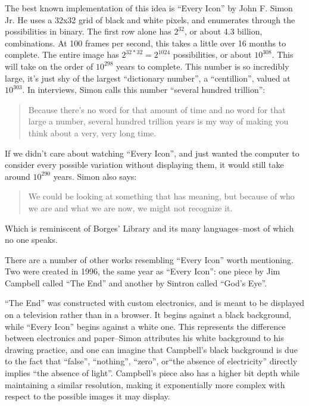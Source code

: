 \documentclass{thesis}
\begin{document}
	The best known implementation of this idea is ``Every Icon'' by John F. Simon Jr.\cite{john_f._simon_jr._every_????} He uses a 32x32 grid of black and white pixels, and enumerates through the possibilities in binary. The first row alone has $2^{32}$, or about 4.3 billion, combinations. At 100 frames per second, this takes a little over 16 months to complete. The entire image has $2^{32*32}=2^{1024}$ possibilities, or about $10^{308}$. This will take on the order of $10^{298}$ years to complete. This number is so incredibly large, it's just shy of the largest ``dictionary number'', a ``centillion'', valued at $10^{303}$. In interviews, Simon calls this number ``several hundred trillion''\cite{matthew_mirapaul_in_1997}:
	
	\begin{quote}
	Because there's no word for that amount of time and no word for that large a number, several hundred trillion years is my way of making you think about a very, very long time.
	\end{quote}
	
	If we didn't care about watching ``Every Icon'', and just wanted the computer to consider every possible variation without displaying them, it would still take around $10^{290}$ years. Simon also says:
	
	\begin{quote}
	We could be looking at something that has meaning, but because of who we are and what we are now, we might not recognize it.
	\end{quote}
	
	Which is reminiscent of Borges' Library and its many languages--most of which no one speaks.
	
	There are a number of other works resembling ``Every Icon'' worth mentioning. Two were created in 1996, the same year as ``Every Icon'': one piece by Jim Campbell called ``The End''\cite{jim_campbell_end_1996} and another by Sintron called ``God's Eye''.\cite{sintron_gods_2003}
	
	``The End'' was constructed with custom electronics, and is meant to be displayed on a television rather than in a browser. It begins against a black background, while ``Every Icon'' begins against a white one. This represents the difference between electronics and paper--Simon attributes his white background to his drawing practice, and one can imagine that Campbell's black background is due to the fact that ``false'', ``nothing'', ``zero'',  or``the absence of electricity'' directly implies ``the absence of light''. Campbell's piece also has a higher bit depth while maintaining a similar resolution, making it exponentially more complex with respect to the possible images it may display.
	
\end{document}
